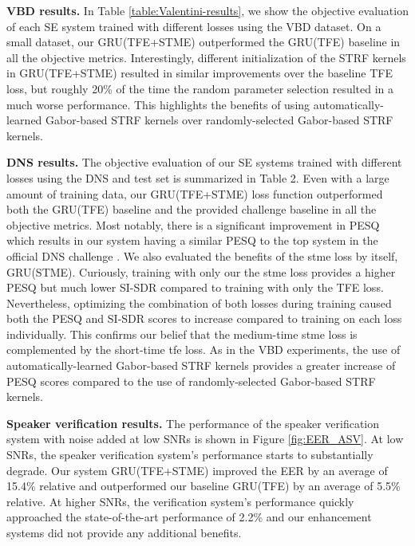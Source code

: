 \documentclass{article}
\begin{document}
\textbf{VBD results.}
In Table \ref{table:Valentini-results}, we show the objective evaluation of each SE system trained with different losses using the VBD dataset.  On a small dataset, our GRU(TFE+STME) outperformed the GRU(TFE) baseline in all the objective metrics.  Interestingly, different initialization of the STRF kernels in GRU(TFE+STME) resulted in similar improvements over the baseline TFE loss, but roughly 20\% of the time the random parameter selection resulted in a much worse performance.  This highlights the benefits of using automatically-learned Gabor-based STRF kernels over randomly-selected Gabor-based STRF kernels.    

\textbf{DNS results.}
The objective evaluation of our SE systems trained with different losses using the DNS   and  test set is summarized in Table 2.  Even with a large amount of training data, our  GRU(TFE+STME) loss function outperformed both the GRU(TFE) baseline and the provided challenge baseline \cite{xiaWeightedSpeechDistortion2020} in all the objective metrics.  Most notably, there is a significant improvement in PESQ which results in our system having a similar PESQ to the top system in the official DNS challenge \cite{isik2020poconet}.  We also evaluated the benefits of the \gls{stme} loss by itself, GRU(STME).  Curiously, training with only our the \gls{stme} loss provides a higher PESQ but much lower SI-SDR compared to training with only the TFE loss.  Nevertheless,  optimizing the combination of both losses  during training caused both the PESQ and SI-SDR scores to increase compared to training on each loss individually. This confirms our belief that the medium-time \gls{stme} loss is complemented by the short-time \gls{tfe} loss. As in the VBD experiments, the use of  automatically-learned Gabor-based STRF kernels provides a greater increase of PESQ scores compared to the use of randomly-selected Gabor-based STRF kernels.
\begin{figure}
  \vspace{-5mm}
\end{figure}

\textbf{Speaker verification results.}
The performance of the speaker verification system with noise added at low SNRs is shown in Figure \ref{fig:EER_ASV}.  At low SNRs, the speaker verification system's performance starts to substantially degrade.  Our system GRU(TFE+STME) improved the EER by an average of 15.4\% relative and outperformed our baseline GRU(TFE) by an average of 5.5\% relative.  At higher SNRs, the verification system's performance quickly approached the state-of-the-art performance of 2.2\% and our enhancement systems did not provide any additional benefits. 
\end{document}
